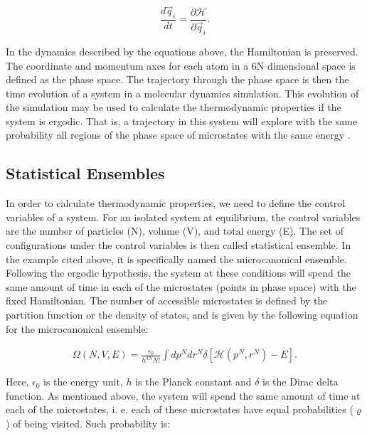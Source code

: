 \begin{equation}
\frac{d \vec{q}_{i}}{dt} =  \frac{\partial \mathcal{H}}{\partial \vec{q}_{i}}.
\end{equation}

In the dynamics described by the equations above, the Hamiltonian is preserved. The coordinate and momentum axes for each atom in a 6N dimensional space is defined as the phase space. The trajectory through the phase space is then the time evolution of a system in a molecular dynamics simulation. This evolution of the simulation may be used to calculate the thermodynamic properties if the system is ergodic. That is, a trajectory in this system will explore with the same probability all regions of the phase space of microstates with the same energy \cite{shell2015}. 

\subsection{Statistical Ensembles}

In order to calculate thermodynamic properties, we need to define the control variables of a system. For an isolated system at equilibrium, the control variables are the number of particles (N), volume (V), and total energy (E). The set of configurations under the control variables is then called statistical ensemble. In the example cited above, it is specifically named the microcanonical ensemble. Following the ergodic hypothesis, the system at these conditions will spend the same amount of time in each of the microstates (points in phase space) with the fixed Hamiltonian.  The number of accessible microstates is defined by the partition function or the density of states, and  is given by the following equation  for the microcanonical ensemble: 

\begin{equation}
\begin{aligned}
\Omega (N,V,E) = \frac{\epsilon_{0}}{h^{3N}N!} \int dp^{N} dr^{N} \delta [\mathcal{H}(p^{N},r^{N}) -E].
\end{aligned}
\end{equation}

Here, $\epsilon _{0}$ is the energy unit, $h$ is the Planck constant and $\delta$ is the Dirac delta function. As mentioned above, the system will spend the same amount of time at each of the microstates, i. e. each of these microstates have equal probabilities ($\varrho$) of being visited. Such probability is:

